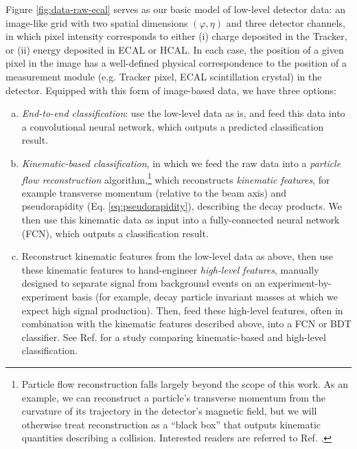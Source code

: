 \documentclass[11pt, a4paper]{article}
\begin{document}
Figure \ref{fig:data-raw-ecal} serves as our basic model of low-level detector data: an image-like grid with two spatial dimensions $ (\varphi, \eta) $ and three detector channels, in which pixel intensity corresponds to either (i) charge deposited in the Tracker, or (ii) energy deposited in ECAL or HCAL. In each case, the position of a given pixel in the image has a well-defined physical correspondence to the position of a measurement module (e.g. Tracker pixel, ECAL scintillation crystal) in the detector. Equipped with this form of image-based data, we have three options:
\begin{enumerate}[(a)]

    \item \textit{End-to-end classification}: use the low-level data as is, and feed this data into a convolutional neural network, which outputs a predicted classification result.

    \item \label{item:kinematic-classification} \textit{Kinematic-based classification}, in which we feed the raw data into a \textit{particle flow reconstruction} algorithm,\footnote{Particle flow reconstruction falls largely beyond the scope of this work. As an example, we can reconstruct a particle's transverse momentum from the curvature of its trajectory in the detector's magnetic field, but we will otherwise treat reconstruction as a ``black box'' that outputs kinematic quantities describing a collision. Interested readers are referred to Ref. \cite{particle-flow}.} which reconstructs \textit{kinematic features}, for example transverse momentum (relative to the beam axis) and pseudorapidity (Eq. \ref{eq:pseudorapidity}), describing the decay products. We then use this kinematic data as input into a fully-connected neural network (FCN), which outputs a classification result. 

    \item \label{item:high-level-classification} Reconstruct kinematic features from the low-level data as above, then use these kinematic features to hand-engineer \textit{high-level features}, manually designed to separate signal from background events on an experiment-by-experiment basis (for example, decay particle invariant masses at which we expect high signal production). Then, feed these high-level features, often in combination with the kinematic features described above, into a FCN or BDT classifier. See Ref. \cite{baldi-higgs} for a study comparing kinematic-based and high-level classification.%


\end{enumerate}
\end{document}
